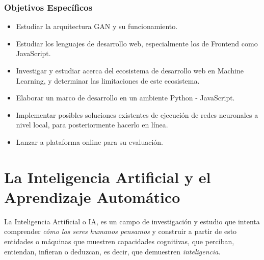 \subsubsection{Objetivos Específicos}
\begin{itemize}
\item Estudiar la arquitectura GAN y su funcionamiento.
\item Estudiar los lenguajes de desarrollo web, especialmente los de Frontend como JavaScript.
\item Investigar y estudiar acerca del ecosistema de desarrollo web en Machine Learning, y determinar las limitaciones de este ecosistema.
\item Elaborar un marco de desarrollo en un ambiente Python - JavaScript.
\item Implementar posibles soluciones existentes de ejecución de redes neuronales a nivel local, para posteriormente hacerlo en línea.
\item Lanzar a plataforma online para su evaluación.

\end{itemize}

\clearpage
\section{La Inteligencia Artificial y el Aprendizaje Automático}

La Inteligencia Artificial o IA, es un campo de investigación y estudio
que intenta comprender \emph{cómo los seres humanos pensamos} y construir
a partir de esto entidades o máquinas que muestren capacidades cognitivas,
que perciban, entiendan, infieran o deduzcan, es decir, que demuestren
\emph{inteligencia}.

